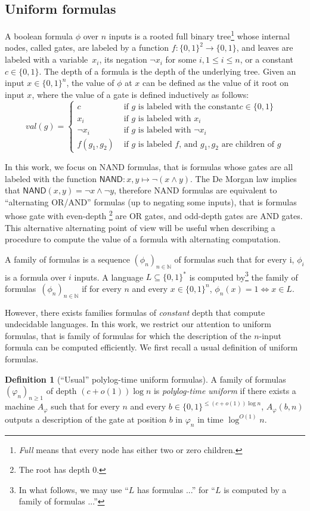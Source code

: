 \documentclass[a4paper, 11pt]{article}
\theoremstyle{plain}
\theoremstyle{definition}
\newtheorem{definition}[theorem]{Definition}
\theoremstyle{remark}
\newcommand{\NN}{\mathbb{N}}%
\newcommand{\bit}{\{0,1\}}%
\newcommand{\NAND}{\textsf{NAND}}%
\begin{document}
\subsection{Uniform formulas}
A boolean formula $\phi$ over $n$ inputs is a 
rooted full binary tree\footnote{\textit{Full} means that every node has either two or zero children.}
whose internal nodes, called gates, are labeled by a function $f: \bit^2 \rightarrow \bit$,
and leaves are labeled with a variable~$x_i$, its negation $\neg x_i$ for some $i, 1\le i \le n$,
or a constant $c\in\bit$.
The depth of a formula is the depth of the underlying tree.
Given an input $x \in\bit^n$, the value of $\phi$ at $x$ can be defined 
as the value of it root on input $x$, 
where the value of a gate is defined inductively as follows:
\[val(g) =\begin{cases}
	c & \text{ if $g$ is labeled with the constant} c\in\bit\\
	x_i & \text{ if $g$ is labeled with $x_i$}\\
	\neg x_i & \text{ if $g$ is labeled with $\neg x_i$}\\
	f(g_1, g_2) & \text{ if $g$ is labeled  $f$, and $g_1,g_2$ are children of $g$}
\end{cases}\]

In this work, we focus on \NAND{} formulas, that is formulas whose gates are all labeled 
with the function $\NAND: x,y \mapsto \neg(x\wedge y)$.
The De Morgan law implies that $\NAND(x, y) = \neg x \wedge \neg y$, 
therefore \NAND{} formulas are equivalent to ``alternating OR/AND'' formulas (up to negating some inputs), 
that is formulas whose gate with even-depth \footnote{The root has depth 0.} 
are OR gates, and odd-depth gates are AND gates.
This alternative alternating point of view will be useful 
when describing a procedure to compute the value of a formula with alternating computation.

A family of formulas is a sequence $(\phi_n)_{n\in\NN}$ of formulas such that
for every i, $\phi_i$ is a formula over $i$ inputs.
A language $L\subseteq \bit^*$
is computed by\footnote{In what follows, we may use ``$L$ has formulas ...'' for ``$L$ is computed by a family of formulas ...''} 
the family of formulas~$(\phi_n)_{n\in\NN}$
if for every $n$ and every $x\in\bit^n$, $\phi_n(x) = 1 \Leftrightarrow x\in L$.

However, there exists families formulas of \textit{constant} depth that compute undecidable languages.
In this work, we restrict our attention to uniform formulas, 
that is family of formulas for which the description of the
$n$-input formula can be computed efficiently.
We first recall a usual definition of uniform formulas.
\begin{definition}[``Usual'' polylog-time uniform formulas]
	A family of formulas $(\varphi_n)_{n \ge 1}$ of depth $(c + o(1))\log n$ 
	is \textit{polylog-time uniform} if there exists a machine $A_\varphi$
	such that for every $n$ and every $b\in\bit^{\leq (c + o(1))\log n}$,
	$A_\varphi(b, n)$ outputs a description of the gate at position $b$ in $\varphi_n$ in time $\log^{O(1)} n$.
\end{definition}
\end{document}
